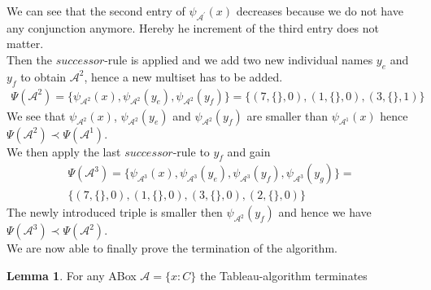 \documentclass{book}
\theoremstyle{break}
\theoremstyle{definition}
\newtheorem{mylem}{Lemma}
\begin{document}
We can see that the second entry of $\psi_{\mathcal{A}^\prime}(x)$ decreases because we do not have any conjunction anymore. Hereby he increment of the third entry does not matter.\\
Then the $successor$-rule is applied and we add two new individual names $y_e$ and $y_f$ to obtain $\mathcal{A}^2$, hence a new multiset has to be added.
\begin{align*}
\Psi(\mathcal{A}^2)=\{\psi_{\mathcal{A}^2}(x),\psi_{\mathcal{A}^2}(y_e), \psi_{\mathcal{A}^2}(y_f)\}=\{(7,\{\},0),(1,\{\},0),(3,\{\},1)\}
\end{align*}
We see that $\psi_{\mathcal{A}^2}(x)$, $\psi_{\mathcal{A}^2}(y_e)$ and $\psi_{\mathcal{A}^2}(y_f)$ are smaller than $\psi_{\mathcal{A}^1}(x)$ hence $\Psi(\mathcal{A}^2)\prec \Psi(\mathcal{A}^1)$.\\
We then apply the last $successor$-rule to $y_f$ and gain
\begin{align*}
\Psi(\mathcal{A}^3)=\{\psi_{\mathcal{A}^3}(x),\psi_{\mathcal{A}^3}(y_e), \psi_{\mathcal{A}^3}(y_f),\psi_{\mathcal{A}^3}(y_g)\}=\\
\{(7,\{\},0),(1,\{\},0),(3,\{\},0),(2,\{\},0)\}
\end{align*}
The newly introduced triple is smaller then $\psi_{\mathcal{A}^2}(y_f)$ and hence we have $\Psi(\mathcal{A}^3)\prec \Psi(\mathcal{A}^2)$.\\
We are now able to finally prove the termination of the algorithm.
\begin{mylem}
For any ABox $\mathcal{A}=\{x:C\}$ the Tableau-algorithm terminates
\end{mylem}
\end{document}
